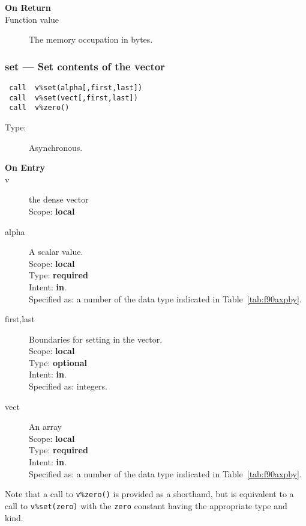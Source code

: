 \begin{description}
\item[\bf On Return]
\item[Function value] The memory occupation in bytes.
\end{description}


\subsubsection{set  --- Set contents of the vector}

\begin{verbatim}
 call  v%set(alpha[,first,last])
 call  v%set(vect[,first,last])
 call  v%zero()
\end{verbatim}

\begin{description}
\item[Type:] Asynchronous.
\item[\bf On Entry]
\item[v] the dense vector\\
Scope: {\bf local}\\
\item[alpha] A scalar value. \\ Scope: {\bf local} \\ Type: {\bf
required} \\ Intent: {\bf in}.\\ Specified as: a number of the data
type indicated in Table~\ref{tab:f90axpby}.

\item[first,last] Boundaries for setting in the vector.\\ Scope: {\bf
    local} \\ Type: {\bf optional} \\ Intent: {\bf in}.\\ Specified
  as: integers.
\item[vect] An  array \\ Scope: {\bf local} \\ Type: {\bf
required} \\ Intent: {\bf in}.\\ Specified as: a number of the data
type indicated in Table~\ref{tab:f90axpby}.
\end{description}
Note that a call to \verb|v%zero()| is provided as a shorthand, but
is equivalent to a call to \verb|v%set(zero)| with  the \verb|zero|
constant having the appropriate type and kind.

